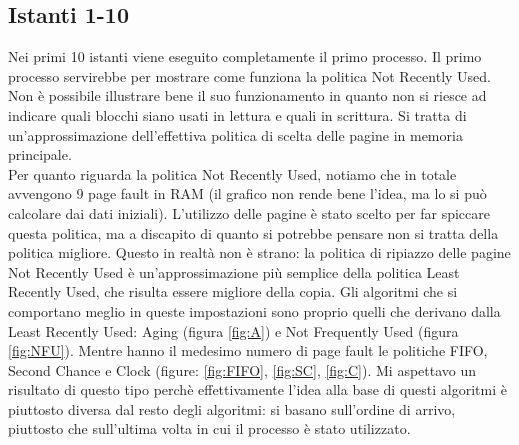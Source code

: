 \documentclass[12px]{article}
\begin{document}
\subsection{Istanti 1-10}
Nei primi 10 istanti viene eseguito completamente il primo processo. Il primo processo servirebbe per mostrare come funziona la politica Not Recently Used. Non è possibile illustrare bene il suo funzionamento in quanto non si riesce ad indicare quali blocchi siano usati in lettura e quali in scrittura. Si tratta di un'approssimazione dell'effettiva politica di scelta delle pagine in memoria principale.\\
Per quanto riguarda la politica Not Recently Used, notiamo che in totale avvengono 9 page fault in RAM (il grafico non rende bene l'idea, ma lo si può calcolare dai dati iniziali). L'utilizzo delle pagine è stato scelto per far spiccare questa politica, ma a discapito di quanto si potrebbe pensare non si tratta della politica migliore. Questo in realtà non è strano: la politica di ripiazzo delle pagine Not Recently Used è un'approssimazione più semplice della politica Least Recently Used, che risulta essere migliore della copia. Gli algoritmi che si comportano meglio in queste impostazioni sono proprio quelli che derivano dalla Least Recently Used: Aging (figura \ref{fig:A}) e Not Frequently Used (figura \ref{fig:NFU}). Mentre hanno il medesimo numero di page fault le politiche FIFO, Second Chance e Clock (figure: \ref{fig:FIFO}, \ref{fig:SC}, \ref{fig:C}). Mi aspettavo un risultato di questo tipo perchè effettivamente l'idea alla base di questi algoritmi è piuttosto diversa dal resto degli algoritmi: si basano sull'ordine di arrivo, piuttosto che sull'ultima volta in cui il processo è stato utilizzato.
\end{document}
